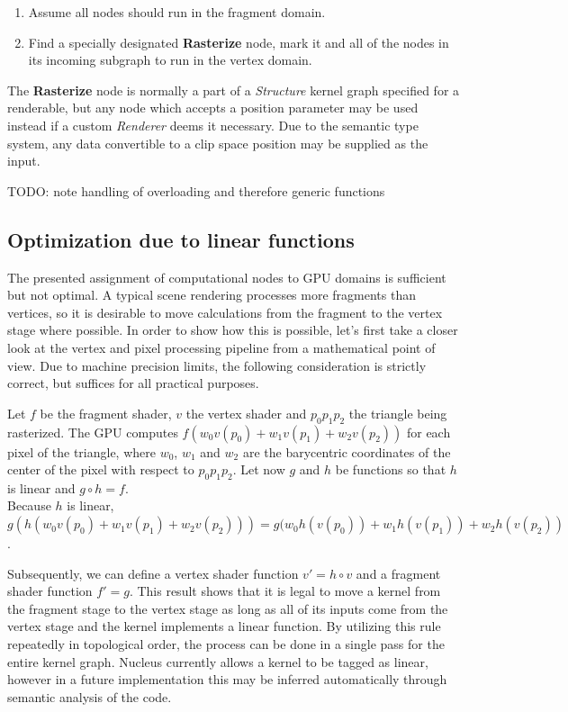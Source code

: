 \begin{enumerate}
\item Assume all nodes should run in the fragment domain.
\item Find a specially designated \textbf{Rasterize} node, mark it and all of the nodes in its incoming subgraph to run in the vertex domain.
\end{enumerate}

The \textbf{Rasterize} node is normally a part of a \emph{Structure} kernel graph specified for a renderable, but any node which accepts a position parameter may be used instead if a custom \emph{Renderer} deems it necessary. Due to the semantic type system, any data convertible to a clip space position may be supplied as the input.

TODO: note handling of overloading and therefore generic functions

\subsection{Optimization due to linear functions}

The presented assignment of computational nodes to GPU domains is sufficient but not optimal. A typical scene rendering processes more fragments than vertices, so it is desirable to move calculations from the fragment to the vertex stage where possible. In order to show how this is possible, let's first take a closer look at the vertex and pixel processing pipeline from a mathematical point of view. Due to machine precision limits, the following consideration is strictly correct, but suffices for all practical purposes.

Let $f$ be the fragment shader, $v$ the vertex shader and $p_0 p_1 p_2$ the triangle being rasterized. The GPU computes $f(w_0 v(p_0) + w_1 v(p_1) + w_2 v(p_2))$ for each pixel of the triangle, where $w_0$, $w_1$ and $w_2$ are the barycentric coordinates of the center of the pixel with respect to $p_0 p_1 p_2$. Let now $g$ and $h$ be functions so that $h$ is linear and $g \circ h = f$. \\
Because $h$ is linear, \\
$g(h(w_0 v(p_0) + w_1 v(p_1) + w_2 v(p_2))) = g(w_0 h(v(p_0)) + w_1 h(v(p_1)) + w_2 h(v(p_2))$.

Subsequently, we can define a vertex shader function $v\prime = h \circ v$ and a fragment shader function $f\prime = g$. This result shows that it is legal to move a kernel from the fragment stage to the vertex stage as long as all of its inputs come from the vertex stage and the kernel implements a linear function. By utilizing this rule repeatedly in topological order, the process can be done in a single pass for the entire kernel graph. Nucleus currently allows a kernel to be tagged as linear, however in a future implementation this may be inferred automatically through semantic analysis of the code.

